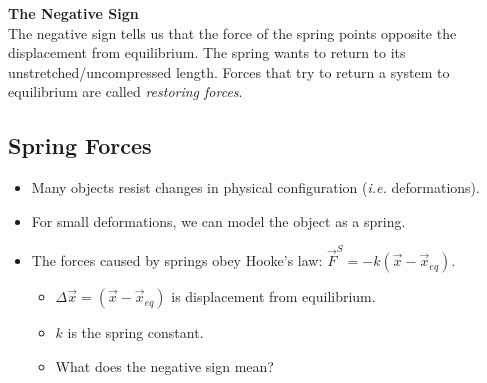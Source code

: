 \documentclass[]{article}
\begin{document}
\newpage
\begin{TeacherMargin}
\noindent\textbf{The Negative Sign} \\
The negative sign tells us that the force of the spring points opposite the displacement from equilibrium. The spring wants to return to its \\
unstretched/uncompressed length. Forces that try to return a system to equilibrium are called \textit{restoring forces}.
\end{TeacherMargin}
\begin{PresentSpace}
\vspace{-10pt}
\section*{Spring Forces}
\vspace{-10pt}
\begin{itemize}
	\item Many objects resist changes in physical configuration (\textit{i.e.} deformations).
	\item For small deformations, we can model the object as a spring.
	\item The forces caused by springs obey Hooke's law: $\vec{F}^{S} = -k(\vec{x}-\vec{x}_{eq})$.
	\begin{itemize}
		\item $\Delta\vec{x} = (\vec{x}-\vec{x}_{eq})$ is displacement from equilibrium.
		\item $k$ is the spring constant.
		\item What does the negative sign mean?
	\end{itemize}
\end{itemize}
\end{PresentSpace}
\newpage
\begin{TeacherMargin}

\end{TeacherMargin}
\end{document}
